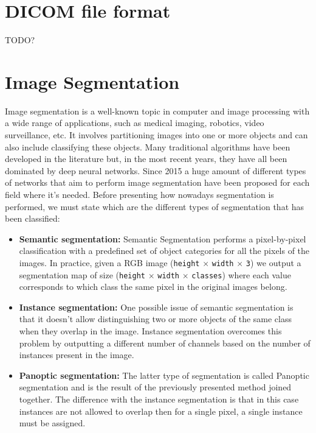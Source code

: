 \section{DICOM file format}
TODO?

\section{Image Segmentation}
Image segmentation is a well-known topic in computer and image processing with a
wide range of applications, such as medical imaging, robotics, video
surveillance, etc.
It involves partitioning images into one or more objects and can also include
classifying these objects. Many traditional algorithms have been developed in the
literature but, in the most recent years, they have all been dominated by deep
neural networks. Since 2015 a huge amount of different types of networks
that aim to perform image segmentation have been proposed for each field
where it's needed.
Before presenting how nowadays segmentation is performed, we must state which are
the different types of segmentation that has been classified:

\begin{itemize}
  \item{\textbf{Semantic segmentation:}
  Semantic Segmentation performs a pixel-by-pixel classification with a predefined
  set of object categories for all the pixels of the images. In practice, given a
  RGB image (\texttt{height} $\times$ \texttt{width} $\times$ \texttt{3}) we output
  a segmentation map of size (\texttt{height} $\times$ \texttt{width} $\times$
  \texttt{classes}) where each value corresponds to which class the same pixel in the
  original images belong.}

  \item{\textbf{Instance segmentation:}
  One possible issue of semantic segmentation is that it doesn't allow distinguishing two or more objects of the same class when they overlap in the image.
  Instance segmentation overcomes this problem by outputting a different number of
  channels based on the number of instances present in the image.}

  \item{\textbf{Panoptic segmentation:}
  The latter type of segmentation is called Panoptic segmentation and is the
  result of the previously presented method joined together. The difference with
  the instance segmentation is that in this case instances are not allowed to
  overlap then for a single pixel, a single instance must be assigned.}
\end{itemize}

